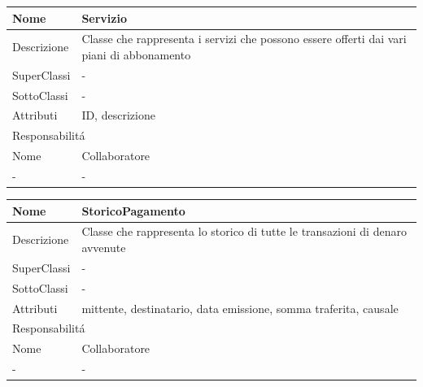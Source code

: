 \begin{center}
    \begin{longtable}{ |p{3cm}|p{3cm}|p{3cm}|p{3cm}| }
        \hline
        Nome & \multicolumn{3}{|p{9cm}|}{Servizio} \\\hline
        Descrizione & \multicolumn{3}{|p{9cm}|}{Classe che rappresenta i servizi che possono essere offerti dai vari piani di abbonamento} \\\hline
        SuperClassi & \multicolumn{3}{|p{9cm}|}{-} \\\hline
        SottoClassi & \multicolumn{3}{|p{9cm}|}{-} \\\hline
        Attributi & \multicolumn{3}{|p{9cm}|}{ID, descrizione} \\\hline
        \multicolumn{4}{|p{12cm}|}{Responsabilit\'a} \\\hline
        \multicolumn{2}{|p{6cm}|}{Nome} & \multicolumn{2}{|p{6cm}|}{Collaboratore} \\\hline
        \multicolumn{2}{|p{6cm}|}{-} & \multicolumn{2}{|p{6cm}|}{-} \\\hline
    \end{longtable}
\end{center}

\begin{center}
    \begin{longtable}{ |p{3cm}|p{3cm}|p{3cm}|p{3cm}| }
        \hline
        Nome & \multicolumn{3}{|p{9cm}|}{StoricoPagamento} \\\hline
        Descrizione & \multicolumn{3}{|p{9cm}|}{Classe che rappresenta lo storico di tutte le transazioni di denaro avvenute} \\\hline
        SuperClassi & \multicolumn{3}{|p{9cm}|}{-} \\\hline
        SottoClassi & \multicolumn{3}{|p{9cm}|}{-} \\\hline
        Attributi & \multicolumn{3}{|p{9cm}|}{mittente, destinatario, data emissione, somma traferita, causale} \\\hline
        \multicolumn{4}{|p{12cm}|}{Responsabilit\'a} \\\hline
        \multicolumn{2}{|p{6cm}|}{Nome} & \multicolumn{2}{|p{6cm}|}{Collaboratore} \\\hline
        \multicolumn{2}{|p{6cm}|}{-} & \multicolumn{2}{|p{6cm}|}{-} \\\hline
    \end{longtable}
\end{center}

